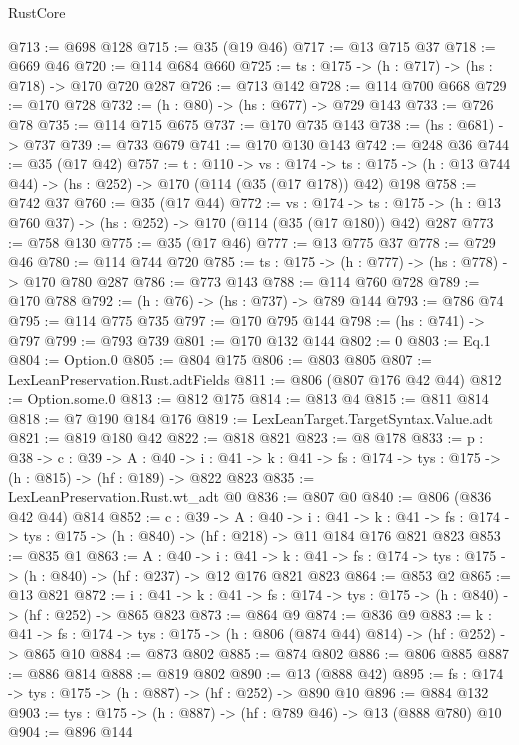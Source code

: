 \begin{lexlean}{RustCore}
\begin{coremodule}
@713 := @698 @128
@715 := @35 (@19 @46)
@717 := @13 @715 @37
@718 := @669 @46
@720 := @114 @684 @660
@725 := {ts : @175} -> (h : @717) -> (hs : @718) -> @170 @720 @287
@726 := @713 @142
@728 := @114 @700 @668
@729 := @170 @728
@732 := (h : @80) -> (hs : @677) -> @729 @143
@733 := @726 @78
@735 := @114 @715 @675
@737 := @170 @735 @143
@738 := (hs : @681) -> @737
@739 := @733 @679
@741 := @170 @130 @143
@742 := @248 @36
@744 := @35 (@17 @42)
@757 := {t : @110} ->
  {vs : @174} ->
  {ts : @175} -> (h : @13 @744 @44) -> (hs : @252) -> @170 (@114 (@35 (@17 @178)) @42) @198
@758 := @742 @37
@760 := @35 (@17 @44)
@772 := {vs : @174} ->
  {ts : @175} -> (h : @13 @760 @37) -> (hs : @252) -> @170 (@114 (@35 (@17 @180)) @42) @287
@773 := @758 @130
@775 := @35 (@17 @46)
@777 := @13 @775 @37
@778 := @729 @46
@780 := @114 @744 @720
@785 := {ts : @175} -> (h : @777) -> (hs : @778) -> @170 @780 @287
@786 := @773 @143
@788 := @114 @760 @728
@789 := @170 @788
@792 := (h : @76) -> (hs : @737) -> @789 @144
@793 := @786 @74
@795 := @114 @775 @735
@797 := @170 @795 @144
@798 := (hs : @741) -> @797
@799 := @793 @739
@801 := @170 @132 @144
@802 := 0
@803 := Eq.{1}
@804 := Option.{0}
@805 := @804 @175
@806 := @803 @805
@807 := LexLeanPreservation.Rust.adtFields
@811 := @806 (@807 @176 @42 @44)
@812 := Option.some.{0}
@813 := @812 @175
@814 := @813 @4
@815 := @811 @814
@818 := @7 @190 @184 @176
@819 := LexLeanTarget.TargetSyntax.Value.adt
@821 := @819 @180 @42
@822 := @818 @821
@823 := @8 @178
@833 := {p : @38} ->
  {c : @39} ->
  {A : @40} ->
  {i : @41} -> {k : @41} -> {fs : @174} -> {tys : @175} -> (h : @815) -> (hf : @189) -> @822 @823
@835 := LexLeanPreservation.Rust.wt_adt @0
@836 := @807 @0
@840 := @806 (@836 @42 @44) @814
@852 := {c : @39} ->
  {A : @40} ->
  {i : @41} ->
  {k : @41} -> {fs : @174} -> {tys : @175} -> (h : @840) -> (hf : @218) -> @11 @184 @176 @821 @823
@853 := @835 @1
@863 := {A : @40} ->
  {i : @41} ->
  {k : @41} -> {fs : @174} -> {tys : @175} -> (h : @840) -> (hf : @237) -> @12 @176 @821 @823
@864 := @853 @2
@865 := @13 @821
@872 := {i : @41} ->
  {k : @41} -> {fs : @174} -> {tys : @175} -> (h : @840) -> (hf : @252) -> @865 @823
@873 := @864 @9
@874 := @836 @9
@883 := {k : @41} ->
  {fs : @174} -> {tys : @175} -> (h : @806 (@874 @44) @814) -> (hf : @252) -> @865 @10
@884 := @873 @802
@885 := @874 @802
@886 := @806 @885
@887 := @886 @814
@888 := @819 @802
@890 := @13 (@888 @42)
@895 := {fs : @174} -> {tys : @175} -> (h : @887) -> (hf : @252) -> @890 @10
@896 := @884 @132
@903 := {tys : @175} -> (h : @887) -> (hf : @789 @46) -> @13 (@888 @780) @10
@904 := @896 @144

\end{coremodule}
\end{lexlean}
